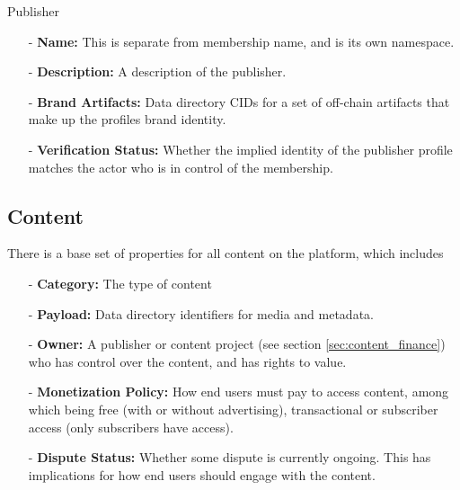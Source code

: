 \documentclass{article}
\newenvironment{concept_box}[1]
    {
    \begin{tcolorbox}
    {\large \textbf{#1} }
    }
    {
    \end{tcolorbox}
    }
\begin{document}
\begin{concept_box}{Publisher}
    \begin{itemize}

        \item[-] \textbf{Name:} This is separate from membership name, and is its own namespace.

        \item[-] \textbf{Description:} A description of the publisher.

        \item[-] \textbf{Brand Artifacts:} Data directory CIDs for a set of off-chain artifacts that make up the profiles brand identity.

        \item[-] \textbf{Verification Status:} Whether the implied identity of the publisher profile matches the actor who is in control of the membership.

    \end{itemize}
\end{concept_box}

\subsection{Content}

There is a base set of properties for all content on the platform, which includes

\begin{itemize}

    \item[-] \textbf{Category:} The type of content

    \item[-] \textbf{Payload:} Data directory identifiers for media and metadata.

    \item[-] \textbf{Owner:} A publisher or content project (see section \ref{sec:content_finance}) who has control over the content, and has rights to value.

    \item[-] \textbf{Monetization Policy:} How end users must pay to access content, among which being free (with or without advertising), transactional or subscriber access (only subscribers have access).

    \item[-] \textbf{Dispute Status:} Whether some dispute is currently ongoing. This has implications for how end users should engage with the content.

\end{itemize}
\end{document}
